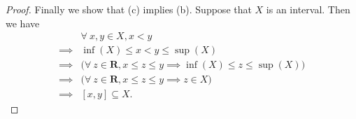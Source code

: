 \begin{proof}
    Finally we show that (c) implies (b).
    Suppose that \(X\) is an interval.
    Then we have
    \begin{align*}
                 & \forall\ x, y \in X, x < y                                                                \\
        \implies & \inf(X) \leq x < y \leq \sup(X)                                                           \\
        \implies & \big(\forall\ z \in \mathbf{R}, x \leq z \leq y \implies \inf(X) \leq z \leq \sup(X)\big) \\
        \implies & \big(\forall\ z \in \mathbf{R}, x \leq z \leq y \implies z \in X\big)                     \\
        \implies & [x, y] \subseteq X.
    \end{align*}
\end{proof}